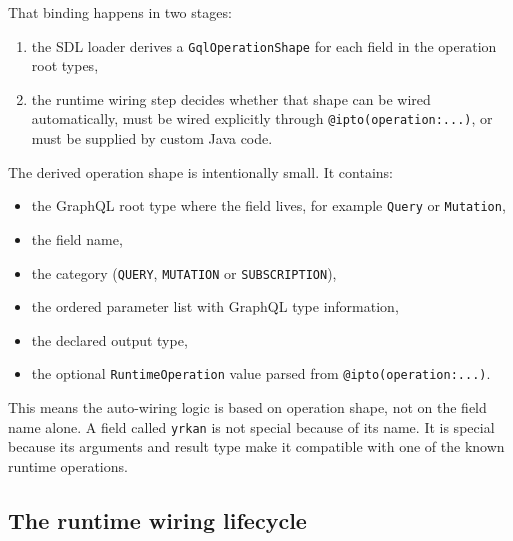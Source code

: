 That binding happens in two stages:
\begin{enumerate}
\item the SDL loader derives a \texttt{GqlOperationShape} for each field in the operation root types,
\item the runtime wiring step decides whether that shape can be wired automatically, must be wired explicitly through \texttt{@ipto(operation:...)}, or must be supplied by custom Java code.
\end{enumerate}

The derived operation shape is intentionally small. It contains:
\begin{itemize}
\item the GraphQL root type where the field lives, for example \texttt{Query} or \texttt{Mutation},
\item the field name,
\item the category (\texttt{QUERY}, \texttt{MUTATION} or \texttt{SUBSCRIPTION}),
\item the ordered parameter list with GraphQL type information,
\item the declared output type,
\item the optional \texttt{RuntimeOperation} value parsed from \texttt{@ipto(operation:...)}.
\end{itemize}

This means the auto-wiring logic is based on operation shape, not on the field name alone. A field called \texttt{yrkan} is not special because of its name. It is special because its arguments and result type make it compatible with one of the known runtime operations.

\subsection{The runtime wiring lifecycle}

